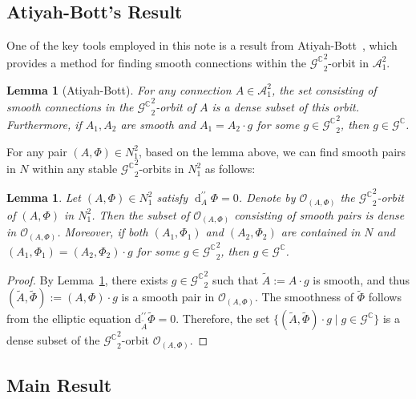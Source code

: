 \documentclass[a4paper]{amsart}
\newtheorem{lemma}[theorem]{Lemma}
\theoremstyle{definition}
\theoremstyle{remark}
\numberwithin{equation}{section}
\begin{document}
\subsection{Atiyah-Bott's Result}

One of the key tools employed in this note is a result from Atiyah-Bott~\cite[Lemma 14.8-9]{atiyah1983yang}, which provides a method for finding smooth connections within the ${\mathscr{G}^\mathbb{C}}_2^2$-orbit in $\mathscr{A}_1^2$.

\begin{lemma}[Atiyah-Bott] \label{A-B}
For any connection $A \in \mathscr{A}_1^2$, the set consisting of smooth connections in the ${\mathscr{G}^\mathbb{C}}_2^2$-orbit of $A$ is a dense subset of this orbit. Furthermore, if $A_1, A_2$ are smooth and $A_1 = A_2 \cdot g$ for some $g \in {\mathscr{G}^\mathbb{C}}_2^2$, then $g \in \mathscr{G}^\mathbb{C}$.
\end{lemma}

For any pair $(A, \Phi) \in N_1^2$, based on the lemma above, we can find smooth pairs in $N$ within any stable ${\mathscr{G}^\mathbb{C}}_2^2$-orbits in $N_1^2$ as follows:

\begin{lemma}\label{AB}
Let $(A, \Phi) \in N_1^2$ satisfy $\operatorname{d}_A^{\prime\prime} \Phi = 0$. Denote  by $\mathcal{O}_{(A, \Phi)}$ the ${\mathscr{G}^\mathbb{C}}_2^2$-orbit of $(A, \Phi)$ in $N_1^2$. Then the subset of $\mathcal{O}_{(A, \Phi)}$ consisting of smooth pairs is dense in $\mathcal{O}_{(A, \Phi)}$. Moreover, if both $(A_1, \Phi_1)$ and $(A_2, \Phi_2)$ are contained in $N$ and $(A_1, \Phi_1) = (A_2, \Phi_2) \cdot g$ for some $g \in {\mathscr{G}^\mathbb{C}}_2^2$, then $g \in \mathscr{G}^\mathbb{C}$.
\end{lemma}

\begin{proof}
By Lemma~\ref{A-B}, there exists $g \in {\mathscr{G}^\mathbb{C}}_2^2$ such that $\tilde{A} := A \cdot g$ is smooth, and thus $(\tilde{A}, \tilde{\Phi}) := (A, \Phi) \cdot g$ is a smooth pair in $\mathcal{O}_{(A, \Phi)}$. The smoothness of $\tilde{\Phi}$ follows from the elliptic equation $\mathrm{d}_{\tilde{A}}^{\prime\prime} \tilde{\Phi} = 0$. Therefore, the set $\Big\{ (\tilde{A}, \tilde{\Phi}) \cdot g \mid g \in \mathscr{G}^\mathbb{C} \Big\}$ is a dense subset of the ${\mathscr{G}^\mathbb{C}}_2^2$-orbit $\mathcal{O}_{(A, \Phi)}$.
\end{proof}
\subsection{Main Result}
\end{document}
